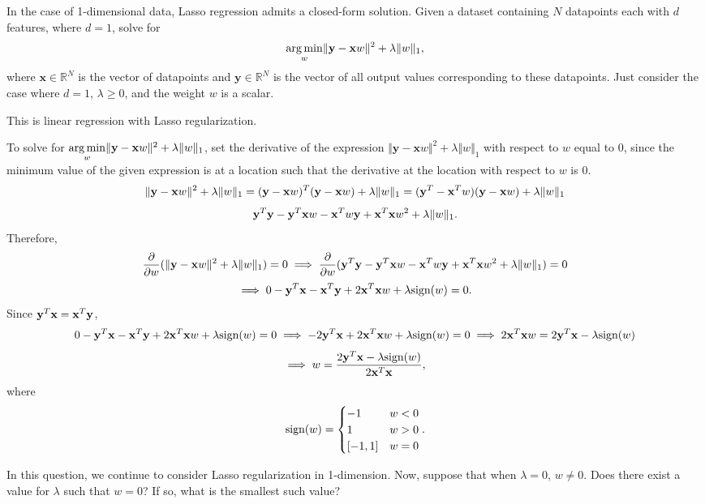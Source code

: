 \medskip
\lstset{
  basicstyle=\small\ttfamily,
  breaklines=true,
  columns=fullflexible
}



\problem[18]

\subproblem
In the case of 1-dimensional data, Lasso regression admits a closed-form solution.
Given a dataset containing $N$ datapoints each with $d$ features, where $d = 1$, solve for
\[\underset{w}{\operatorname{arg\,min}} \Vert\mathbf{y} - \mathbf{x}w\Vert^2 + \lambda\Vert w\Vert_1,
\]
where $\mathbf{x} \in \mathbb{R}^{N}$ is the vector of datapoints and $\mathbf{y} \in \mathbb{R}^N$ is the  vector of all output values corresponding to these datapoints. Just consider the case where $d = 1$, $\lambda \geq 0$, and the weight $w$ is a scalar.

This is linear regression with Lasso regularization.

To solve for $\underset{w}{\operatorname{arg\,min}} \Vert\mathbf{y} - \mathbf{x}w\Vert^2 + \lambda\Vert w\Vert_1$, set the derivative of the expression $\Vert\mathbf{y} - \mathbf{x}w\Vert^2 + \lambda\Vert w\Vert_1$ with respect to $w$ equal to 0, since the minimum value of the given expression is at a location such that the derivative at the location with respect to $w$ is 0.
\[ \Vert\mathbf{y} - \mathbf{x} w\Vert^2 + \lambda\Vert w\Vert_1 = (\mathbf{y} - \mathbf{x} w)^T(\mathbf{y} - \mathbf{x} w) + \lambda\Vert w\Vert_1 = (\mathbf{y}^T - \mathbf{x}^T w)(\mathbf{y} - \mathbf{x} w) + \lambda\Vert w\Vert_1 \]
\[ \mathbf{y}^T\mathbf{y} - \mathbf{y}^T\mathbf{x} w - \mathbf{x}^T w \mathbf{y} + \mathbf{x}^T\mathbf{x} w^2 + \lambda\Vert w\Vert_1. \]
Therefore,
\[ \frac{\partial}{\partial w}(\Vert\mathbf{y} - \mathbf{x} w\Vert^2 + \lambda\Vert w\Vert_1) = 0 \implies \frac{\partial}{\partial w}(\mathbf{y}^T\mathbf{y} - \mathbf{y}^T\mathbf{x} w - \mathbf{x}^T w \mathbf{y} + \mathbf{x}^T\mathbf{x} w^2 + \lambda\Vert w\Vert_1) = 0 \]
\[ \implies 0 - \mathbf{y}^T\mathbf{x} - \mathbf{x}^T\mathbf{y} + 2\mathbf{x}^T\mathbf{x} w + \lambda\text{sign}(w) = 0. \]
Since $\mathbf{y}^T\mathbf{x} = \mathbf{x}^T\mathbf{y}$,
\[ 0 - \mathbf{y}^T\mathbf{x} - \mathbf{x}^T\mathbf{y} + 2\mathbf{x}^T\mathbf{x} w + \lambda\text{sign}(w) = 0 \implies -2\mathbf{y}^T\mathbf{x} + 2\mathbf{x}^T\mathbf{x} w + \lambda\text{sign}(w) = 0 \implies 2\mathbf{x}^T\mathbf{x} w = 2\mathbf{y}^T\mathbf{x} - \lambda\text{sign}(w) \]
\[ \implies w = \dfrac{2\mathbf{y}^T\mathbf{x} - \lambda\text{sign}(w)}{2\mathbf{x}^T\mathbf{x}}, \]
where
\[ \text{sign}(w) =
\begin{cases} 
   -1 & w < 0 \\
   1 & w > 0 \\
   [-1, 1] & w = 0
\end{cases}. \]

\subproblem
In this question, we continue to consider Lasso regularization in 1-dimension. Now, suppose that when $\lambda = 0$, $w \neq 0$. Does there exist a value for $\lambda$ such that $w = 0$? If so, what is the smallest such value?


